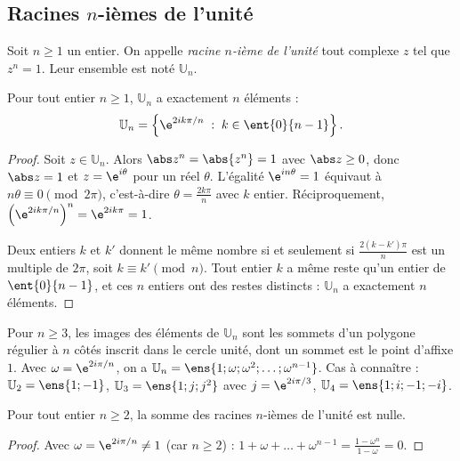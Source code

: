 \subsection{Racines $n$-ièmes de l'unité}
\begin{definition}
Soit $n\ge1$ un entier. On appelle \emph{racine $n$-ième de l'unité} tout complexe $z$ tel que $z^n=1$. Leur ensemble est noté $\mathbb U_n$.
\end{definition}
\begin{theorem}
Pour tout entier $n\ge1$, $\mathbb U_n$ a exactement $n$ éléments :
\[\mathbb U_n=\left\{\e^{2ik\pi/n}\;:\;k\in\ent{0}{n-1}\right\}.\]
\end{theorem}
\begin{proof}
Soit $z\in\mathbb U_n$. Alors $\abs z^n=\abs{z^n}=1$ avec $\abs z\ge0$, donc $\abs z=1$ et $z=\e^{i\theta}$ pour un réel $\theta$. L'égalité $\e^{in\theta}=1$ équivaut à $n\theta\equiv0\pmod{2\pi}$, c'est-à-dire $\theta=\frac{2k\pi}n$ avec $k$ entier. Réciproquement, $\left(\e^{2ik\pi/n}\right)^n=\e^{2ik\pi}=1$.\par
Deux entiers $k$ et $k'$ donnent le même nombre si et seulement si $\frac{2(k-k')\pi}{n}$ est un multiple de $2\pi$, soit $k\equiv k'\pmod n$. Tout entier $k$ a même reste qu'un entier de $\ent{0}{n-1}$, et ces $n$ entiers ont des restes distincts : $\mathbb U_n$ a exactement $n$ éléments.
\end{proof}
\begin{keypoint}
Pour $n\ge3$, les images des éléments de $\mathbb U_n$ sont les sommets d'un polygone régulier à $n$ côtés inscrit dans le cercle unité, dont un sommet est le point d'affixe $1$. Avec $\omega=\e^{2i\pi/n}$, on a $\mathbb U_n=\ens{1;\omega;\omega^2;\dots;\omega^{n-1}}$. Cas à connaître : $\mathbb U_2=\ens{1;-1}$, $\mathbb U_3=\ens{1;j;j^2}$ avec $j=\e^{2i\pi/3}$, $\mathbb U_4=\ens{1;i;-1;-i}$.
\end{keypoint}
\begin{theorem}
Pour tout entier $n\ge2$, la somme des racines $n$-ièmes de l'unité est nulle.
\end{theorem}
\begin{proof}
Avec $\omega=\e^{2i\pi/n}\neq1$ (car $n\ge2$) : $1+\omega+\dots+\omega^{n-1}=\frac{1-\omega^n}{1-\omega}=0$.
\end{proof}
\begin{figurebox}
\end{figurebox}

